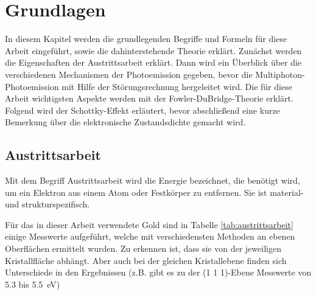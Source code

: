 \documentclass[bachelor,       %
               twoside,        %
               BCOR10mm,       %
               english,ngerman, %
               final,          %
               ]{GAUBM}
\begin{document}
\chapter{Grundlagen}
In diesem Kapitel werden die grundlegenden Begriffe und Formeln für diese Arbeit eingeführt, sowie die dahinterstehende Theorie erklärt.
Zunächst werden die Eigenschaften der Austrittsarbeit erklärt.
Dann wird ein Überblick über die verschiedenen Mechanismen der Photoemission gegeben, bevor die Multiphoton-Photoemission mit Hilfe der Störungsrechnung hergeleitet wird.
Die für diese Arbeit wichtigsten Aspekte werden mit der Fowler-DuBridge-Theorie erklärt.
Folgend wird der Schottky-Effekt erläutert, bevor abschließend eine kurze Bemerkung über die elektronische Zustandsdichte gemacht wird.


\section{Austrittsarbeit}
Mit dem Begriff Austrittsarbeit wird die Energie bezeichnet, die benötigt wird, um ein Elektron aus einem Atom oder Festkörper zu entfernen.
Sie ist material- und strukturspezifisch. 

Für das in dieser Arbeit verwendete Gold sind in Tabelle \ref{tab:austrittsarbeit} einige Messwerte aufgeführt, welche mit verschiedensten Methoden an ebenen Oberflächen ermittelt wurden.
Zu erkennen ist, dass sie von der jeweiligen Kristallfläche abhängt.
Aber auch bei der gleichen Kristallebene finden sich Unterschiede in den Ergebnissen (z.B. gibt es zu der (1 1 1)-Ebene Messwerte von 5.3 bis \SI{5.5}{\eV})
\end{document}

